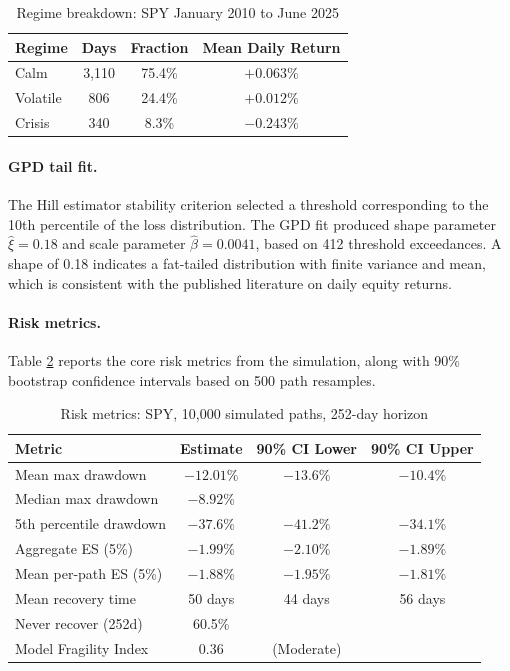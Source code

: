 \documentclass[12pt]{article}
\begin{document}
\begin{table}[h]
\centering
\caption{Regime breakdown: SPY January 2010 to June 2025}
\label{tab:spy_regimes}
\begin{tabular}{lccc}
\toprule
Regime & Days & Fraction & Mean Daily Return \\
\midrule
Calm     & 3,110 & 75.4\% & $+0.063\%$ \\
Volatile &   806 & 24.4\% & $+0.012\%$ \\
Crisis   &   340 &  8.3\% & $-0.243\%$ \\
\bottomrule
\end{tabular}
\end{table}

\paragraph{GPD tail fit.}

The Hill estimator stability criterion selected a threshold corresponding to
the 10th percentile of the loss distribution. The GPD fit produced shape parameter
$\hat\xi = 0.18$ and scale parameter $\hat\beta = 0.0041$, based on 412 threshold
exceedances. A shape of 0.18 indicates a fat-tailed distribution with finite variance
and mean, which is consistent with the published literature on daily equity returns.

\paragraph{Risk metrics.}

Table \ref{tab:spy_metrics} reports the core risk metrics from the simulation,
along with 90\% bootstrap confidence intervals based on 500 path resamples.

\begin{table}[h]
\centering
\caption{Risk metrics: SPY, 10{,}000 simulated paths, 252-day horizon}
\label{tab:spy_metrics}
\begin{tabular}{lccc}
\toprule
Metric & Estimate & 90\% CI Lower & 90\% CI Upper \\
\midrule
Mean max drawdown      & $-12.01\%$  & $-13.6\%$   & $-10.4\%$  \\
Median max drawdown    & $-8.92\%$   &             &            \\
5th percentile drawdown & $-37.6\%$  & $-41.2\%$   & $-34.1\%$  \\
Aggregate ES (5\%)     & $-1.99\%$   & $-2.10\%$   & $-1.89\%$  \\
Mean per-path ES (5\%) & $-1.88\%$   & $-1.95\%$   & $-1.81\%$  \\
Mean recovery time     & 50 days     & 44 days      & 56 days    \\
Never recover (252d)   & 60.5\%      &             &            \\
Model Fragility Index  & 0.36        & (Moderate)  &            \\
\bottomrule
\end{tabular}
\end{table}
\end{document}
